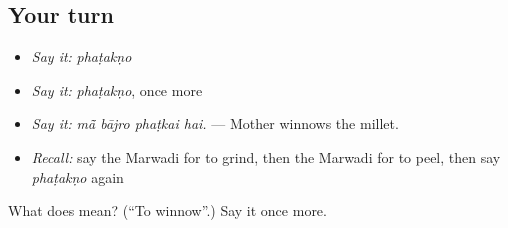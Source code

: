 \subsection*{Your turn}
\begin{itemize}
\raggedright
  \item \emph{Say it:} \emph{phaṭakṇo}
  \item \emph{Say it:} \emph{phaṭakṇo}, once more
  \item \emph{Say it:} \emph{mā̃ bājro phaṭkai hai.} — Mother winnows the millet.
  \item \emph{Recall:} say the Marwadi for to grind, then the Marwadi for to peel, then say \emph{phaṭakṇo} again
\end{itemize}

\begin{tcolorbox}[breakable,colback=teal!4,colframe=teal!35!black,title={Before you move on}]
What does  mean? (\textquotedblleft{}To winnow\textquotedblright{}.) Say it once more.
\end{tcolorbox}
